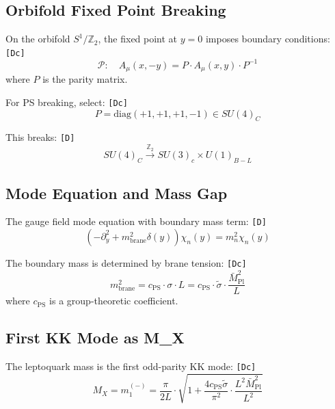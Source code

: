 \documentclass[11pt,a4paper]{article}
\newcommand{\tagD}{\textcolor{green!50!black}{\texttt{[D]}}}
\newcommand{\tagDc}{\textcolor{blue!70!black}{\texttt{[Dc]}}}
\theoremstyle{definition}
\begin{document}
\subsection{Orbifold Fixed Point Breaking}
\label{subsec:orbifold-breaking}

On the orbifold $S^1/\mathbb{Z}_2$, the fixed point at $y = 0$ imposes
boundary conditions: \tagDc{}
\begin{equation}
\label{eq:orbifold-bc}
\mathcal{P}: \quad A_\mu(x, -y) = P \cdot A_\mu(x, y) \cdot P^{-1}
\end{equation}
where $P$ is the parity matrix.

For PS breaking, select: \tagDc{}
\begin{equation}
\label{eq:parity-matrix}
P = \text{diag}(+1, +1, +1, -1) \in SU(4)_C
\end{equation}

This breaks: \tagD{}
\begin{equation}
\label{eq:su4-to-su3}
SU(4)_C \xrightarrow{\mathbb{Z}_2} SU(3)_c \times U(1)_{B-L}
\end{equation}

\subsection{Mode Equation and Mass Gap}
\label{subsec:mode-equation}

The gauge field mode equation with boundary mass term: \tagD{}
\begin{equation}
\label{eq:mode-equation}
\left(-\partial_y^2 + m_{\text{brane}}^2 \delta(y)\right) \chi_n(y) = m_n^2 \chi_n(y)
\end{equation}

The boundary mass is determined by brane tension: \tagDc{}
\begin{equation}
\label{eq:boundary-mass}
m_{\text{brane}}^2 = c_{\text{PS}} \cdot \sigma \cdot L = c_{\text{PS}} \cdot \tilde{\sigma} \cdot \frac{\bar{M}_{\text{Pl}}^2}{L}
\end{equation}
where $c_{\text{PS}}$ is a group-theoretic coefficient.

\subsection{First KK Mode as M\_X}
\label{subsec:first-kk}

The leptoquark mass is the first odd-parity KK mode: \tagDc{}
\begin{equation}
\label{eq:first-odd-mode}
M_X = m_1^{(-)} = \frac{\pi}{2L} \cdot \sqrt{1 + \frac{4 c_{\text{PS}} \tilde{\sigma}}{\pi^2} \cdot \frac{L^2 \bar{M}_{\text{Pl}}^2}{L^2}}
\end{equation}
\end{document}
